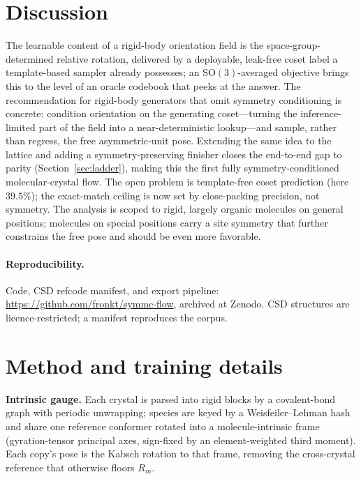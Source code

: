 \documentclass{article}
\begin{document}
\section{Discussion}
The learnable content of a rigid-body orientation field is the
space-group-determined relative rotation, delivered by a deployable, leak-free
coset label a template-based sampler already possesses; an
$\mathrm{SO}(3)$-averaged objective brings this to the level of an oracle codebook
that peeks at the answer. The recommendation for rigid-body generators that omit
symmetry conditioning\cite{zeng2026molcrystalflow} is concrete: condition
orientation on the generating coset---turning the inference-limited part of the
field into a near-deterministic lookup---and sample, rather than regress, the free
asymmetric-unit pose. Extending the same idea to the lattice and adding a
symmetry-preserving finisher closes the end-to-end gap to parity
(Section~\ref{sec:ladder}), making this the first fully symmetry-conditioned
molecular-crystal flow. The open problem is template-free coset prediction (here
$39.5\%$); the exact-match ceiling is now set by close-packing precision, not
symmetry. The analysis is scoped to rigid, largely organic molecules on general
positions; molecules on special positions carry a site symmetry that further
constrains the free pose and should be even more favorable.

\paragraph{Reproducibility.} Code, CSD refcode manifest, and export pipeline:
\url{https://github.com/fronkt/symmc-flow}, archived at
Zenodo\cite{cai2026symmcflow}. CSD structures are licence-restricted; a manifest
reproduces the corpus.

\small



\normalsize
\appendix
\section{Method and training details}
\label{app:method}
\textbf{Intrinsic gauge.} Each crystal is parsed into rigid blocks by a
covalent-bond graph with periodic unwrapping; species are keyed by a
Weisfeiler--Lehman hash and share one reference conformer rotated into a
molecule-intrinsic frame (gyration-tensor principal axes, sign-fixed by an
element-weighted third moment). Each copy's pose is the Kabsch rotation to that
frame, removing the cross-crystal reference that otherwise floors $R_m$.
\end{document}
